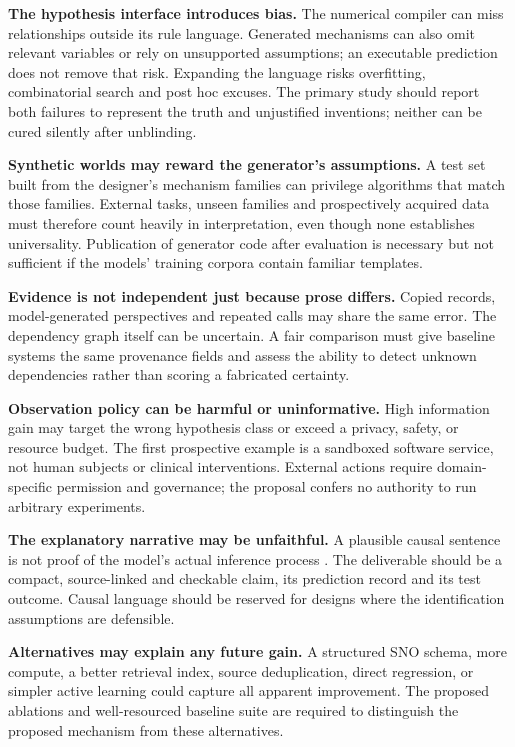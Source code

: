 \documentclass[11pt,a4paper]{article}
\begin{document}
\textbf{The hypothesis interface introduces bias.} The numerical
compiler can miss relationships outside its rule language. Generated
mechanisms can also omit relevant variables or rely on unsupported
assumptions; an executable prediction does not remove that risk.
Expanding the language risks overfitting, combinatorial search and post
hoc excuses. The primary study should report both failures to represent
the truth and unjustified inventions; neither can be cured silently
after unblinding.

\textbf{Synthetic worlds may reward the generator's assumptions.} A test
set built from the designer's mechanism families can privilege
algorithms that match those families. External tasks, unseen families
and prospectively acquired data must therefore count heavily in
interpretation, even though none establishes universality. Publication
of generator code after evaluation is necessary but not sufficient if
the models' training corpora contain familiar templates.

\textbf{Evidence is not independent just because prose differs.} Copied
records, model-generated perspectives and repeated calls may share the
same error. The dependency graph itself can be uncertain. A fair
comparison must give baseline systems the same provenance fields and
assess the ability to detect unknown dependencies rather than scoring a
fabricated certainty.

\textbf{Observation policy can be harmful or uninformative.} High
information gain may target the wrong hypothesis class or exceed a
privacy, safety, or resource budget. The first prospective example is a
sandboxed software service, not human subjects or clinical
interventions. External actions require domain-specific permission and
governance; the proposal confers no authority to run arbitrary
experiments.

\textbf{The explanatory narrative may be unfaithful.} A plausible causal
sentence is not proof of the model's actual inference process
\citep{R18}. The deliverable should be a compact, source-linked and
checkable claim, its prediction record and its test outcome. Causal
language should be reserved for designs where the identification
assumptions are defensible.

\textbf{Alternatives may explain any future gain.} A structured SNO
schema, more compute, a better retrieval index, source deduplication,
direct regression, or simpler active learning could capture all apparent
improvement. The proposed ablations and well-resourced baseline suite
are required to distinguish the proposed mechanism from these
alternatives.
\end{document}
